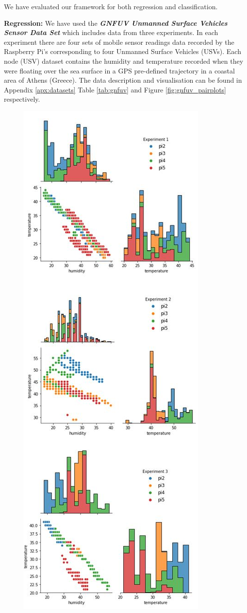 \documentclass{mpaper}
\begin{document}
We have evaluated our framework for both regression and classification. 

\textbf{Regression:} We have used the \textbf{\textit{GNFUV Unmanned Surface Vehicles Sensor Data Set}} \cite{GNFUV} which includes data from three experiments. In each experiment there are four sets of mobile sensor readings data recorded by the Raspberry Pi's corresponding to four Unmanned Surface Vehicles (USVs). Each node (USV) dataset contains the humidity and temperature recorded when they were floating over the sea surface in a GPS pre-defined trajectory in a coastal area of Athens (Greece). The data description and visualisation can be found in Appendix \ref{apx:datasets} Table \ref{tab:gnfuv} and Figure \ref{fig:gnfuv_pairplots} respectively. 

\begin{figure}
\centering
\begin{center}
\includegraphics[scale=0.75]{gnfuv_pairplots.JPG}

\end{center}
\end{figure}
\end{document}

